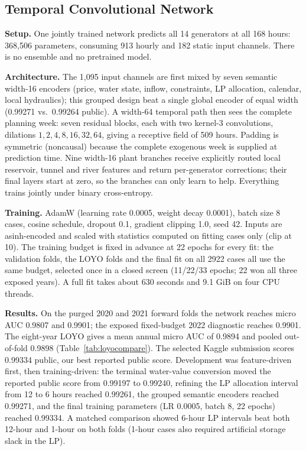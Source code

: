 \documentclass{article}
\begin{document}
\subsection{Temporal Convolutional Network}
\label{sec:tcn}

\textbf{Setup.} One jointly trained network predicts all 14 generators at
all 168 hours: 368{,}506 parameters, consuming 913 hourly and 182 static
input channels. There is no ensemble and no pretrained model.

\textbf{Architecture.} The 1{,}095 input channels are first mixed by
seven semantic width-16 encoders (price, water state, inflow,
constraints, LP allocation, calendar, local hydraulics); this grouped
design beat a single global encoder of equal width (0.99271 vs.\ 0.99264
public). A width-64 temporal path then sees the complete planning week:
seven residual blocks, each with two kernel-3 convolutions, dilations
$1,2,4,8,16,32,64$, giving a receptive field of 509 hours. Padding is
symmetric (noncausal) because the complete exogenous week is supplied at
prediction time. Nine width-16 plant branches receive explicitly routed
local reservoir, tunnel and river features and return per-generator
corrections; their final layers start at zero, so the branches can only
learn to help. Everything trains jointly under binary cross-entropy.

\textbf{Training.} AdamW (learning rate 0.0005, weight decay 0.0001),
batch size 8 cases, cosine schedule, dropout 0.1, gradient clipping 1.0,
seed 42. Inputs are asinh-encoded and scaled with statistics computed on
fitting cases only (clip at 10). The training budget is fixed in advance
at 22 epochs for every fit: the validation folds, the LOYO folds and the
final fit on all 2922 cases all use the same budget, selected once in a
closed screen (11/22/33 epochs; 22 won all three exposed years). A full
fit takes about 630 seconds and 9.1 GiB on four CPU threads.

\textbf{Results.} On the purged 2020 and 2021 forward folds the network
reaches micro AUC 0.9807 and 0.9901; the exposed fixed-budget 2022
diagnostic reaches 0.9901. The eight-year LOYO gives a mean annual micro
AUC of 0.9894 and pooled out-of-fold 0.9898
(Table~\ref{tab:loyocompare}). The selected Kaggle submission scores
0.99334 public, our best reported public score. Development was
feature-driven first, then training-driven: the terminal water-value
conversion moved the reported public score from 0.99197 to 0.99240,
refining the LP allocation interval from 12 to 6 hours reached 0.99261,
the grouped semantic encoders reached 0.99271, and the final training
parameters (LR 0.0005, batch 8, 22 epochs) reached 0.99334. A matched
comparison showed 6-hour LP intervals beat both 12-hour and 1-hour on
both folds (1-hour cases also required artificial storage slack in the
LP).
\end{document}
